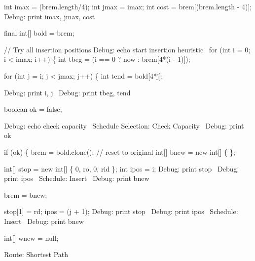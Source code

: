       int imax = (brem.length/4);
      int jmax = imax;
      int cost = brem[(brem.length - 4)];
      \LA{}Debug: print imax, jmax, cost~{\nwtagstyle{}}\RA{}

      final int[] bold = brem;

      // Try all insertion positions
      \LA{}Debug: echo start insertion heuristic~{\nwtagstyle{}}\RA{}
      for (int i = 0; i < imax; i++) \{
        int tbeg = (i == 0 ? now : brem[4*(i - 1)]);

        for (int j = i; j < jmax; j++) \{
          int tend = bold[4*j];

          \LA{}Debug: print i, j~{\nwtagstyle{}}\RA{}
          \LA{}Debug: print tbeg, tend~{\nwtagstyle{}}\RA{}

          boolean ok = false;

          \LA{}Debug: echo check capacity~{\nwtagstyle{}}\RA{}
          \LA{}Schedule Selection: Check Capacity~{\nwtagstyle{}}\RA{}
          \LA{}Debug: print ok~{\nwtagstyle{}}\RA{}

          if (ok) \{
            brem = bold.clone();  // reset to original
            int[] bnew = new int[] \{ \};

            int[] stop = new int[] \{ 0, ro, 0, rid \};
            int ipos = i;
            \LA{}Debug: print stop~{\nwtagstyle{}}\RA{}
            \LA{}Debug: print ipos~{\nwtagstyle{}}\RA{}
            \LA{}Schedule: Insert~{\nwtagstyle{}}\RA{}
            \LA{}Debug: print bnew~{\nwtagstyle{}}\RA{}

            brem = bnew;

            stop[1] = rd;
            ipos = (j + 1);
            \LA{}Debug: print stop~{\nwtagstyle{}}\RA{}
            \LA{}Debug: print ipos~{\nwtagstyle{}}\RA{}
            \LA{}Schedule: Insert~{\nwtagstyle{}}\RA{}
            \LA{}Debug: print bnew~{\nwtagstyle{}}\RA{}

            int[] wnew = null;

            \LA{}Route: Shortest Path~{\nwtagstyle{}}\RA{}

